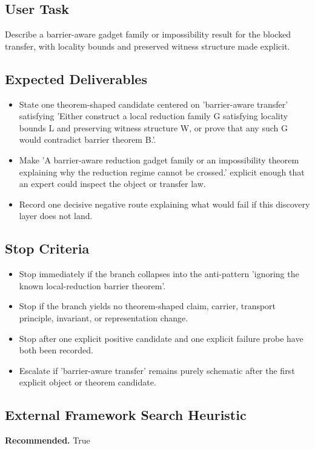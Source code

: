 \documentclass[11pt]{article}
\begin{document}
\subsection*{User Task}
Describe a barrier-aware gadget family or impossibility result for the blocked transfer, with locality bounds and preserved witness structure made explicit.

\subsection*{Expected Deliverables}
\begin{itemize}[leftmargin=*,itemsep=0.2em]
\item State one theorem-shaped candidate centered on 'barrier-aware transfer' satisfying 'Either construct a local reduction family G satisfying locality bounds L and preserving witness structure W, or prove that any such G would contradict barrier theorem B.'.
\item Make 'A barrier-aware reduction gadget family or an impossibility theorem explaining why the reduction regime cannot be crossed.' explicit enough that an expert could inspect the object or transfer law.
\item Record one decisive negative route explaining what would fail if this discovery layer does not land.
\end{itemize}
\subsection*{Stop Criteria}
\begin{itemize}[leftmargin=*,itemsep=0.2em]
\item Stop immediately if the branch collapses into the anti-pattern 'ignoring the known local-reduction barrier theorem'.
\item Stop if the branch yields no theorem-shaped claim, carrier, transport principle, invariant, or representation change.
\item Stop after one explicit positive candidate and one explicit failure probe have both been recorded.
\item Escalate if 'barrier-aware transfer' remains purely schematic after the first explicit object or theorem candidate.
\end{itemize}
\subsection*{External Framework Search Heuristic}
\textbf{Recommended.} True
\end{document}
